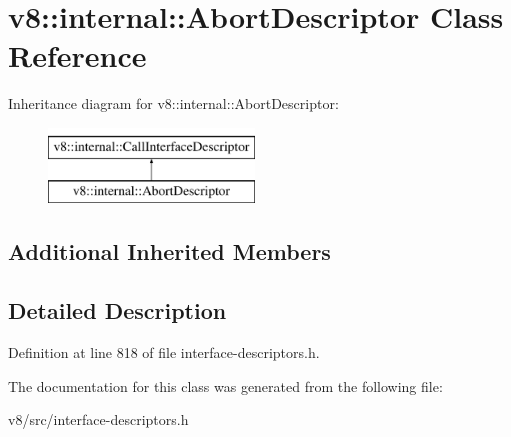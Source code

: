 \hypertarget{classv8_1_1internal_1_1AbortDescriptor}{}\section{v8\+:\+:internal\+:\+:Abort\+Descriptor Class Reference}
\label{classv8_1_1internal_1_1AbortDescriptor}
Inheritance diagram for v8\+:\+:internal\+:\+:Abort\+Descriptor\+:\begin{figure}[H]
\begin{center}
\leavevmode
\includegraphics[height=2.000000cm]{classv8_1_1internal_1_1AbortDescriptor}
\end{center}
\end{figure}
\subsection*{Additional Inherited Members}


\subsection{Detailed Description}


Definition at line 818 of file interface-\/descriptors.\+h.



The documentation for this class was generated from the following file\+:\begin{DoxyCompactItemize}
\item 
v8/src/interface-\/descriptors.\+h\end{DoxyCompactItemize}
